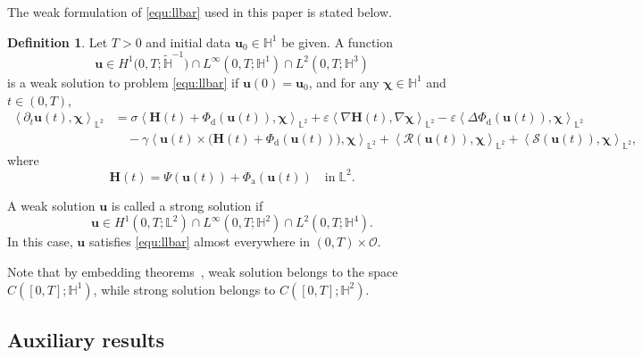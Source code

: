\documentclass[11pt, reqno]{amsart}
\theoremstyle{definition}
\newtheorem{definition}[theorem]{Definition}
\numberwithin{equation}{section}
\newcommand{\bff}{\boldsymbol}
\newcommand{\bb}{\mathbb}
\newcommand{\inpro}[2]{\left\langle#1,#2\right\rangle}
\begin{document}
The weak formulation of \eqref{equ:llbar} used in this paper is stated below.

\begin{definition}\label{def:weakform}
	Let $T>0$ and initial data $\bff{u}_0\in \bb{H}^1$ be given. A function 
    \[
    \bff{u}\in H^1\big(0,T; \widetilde{\bb{H}}^{-1}\big) \cap L^\infty(0,T;\bb{H}^1) \cap L^2(0,T;\bb{H}^3) 
    \]
    is a weak solution to problem
	\eqref{equ:llbar} if $\bff{u}(0)=\bff{u}_0$, and for any $\bff{\chi}\in \bb{H}^1$ and $t\in (0,T)$,
	\begin{align*}
		\inpro{\partial_t \bff{u}(t)}{\bff{\chi}}_{\bb{L}^2}
		&=
		\sigma 
		\inpro{\bff{H}(t)+\Phi_{\mathrm{d}}(\bff{u}(t))}{\bff{\chi}}_{\bb{L}^2}
		+
		\varepsilon
		\inpro{\nabla \bff{H}(t)}{\nabla
			\bff{\chi}}_{\bb{L}^2}
		-
		\varepsilon 
		\inpro{\Delta \Phi_{\mathrm{d}}(\bff{u}(t))}{\bff{\chi}}_{\bb{L}^2}
		\nonumber \\
		&\quad 
		-
		\gamma 
		\inpro{\bff{u}(t) \times \big(\bff{H}(t)+\Phi_{\mathrm{d}}(\bff{u}(t))\big)}{\bff{\chi}}_{\bb{L}^2}
		+
		\inpro{\mathcal{R}(\bff{u}(t))}{\bff{\chi}}_{\bb{L}^2}
        +
		\inpro{\mathcal{S}(\bff{u}(t))}{\bff{\chi}}_{\bb{L}^2},
	\end{align*}
	where 
 \begin{equation}\label{eq:H def}
 \bff{H}(t)= \Psi(\bff{u}(t))+ \Phi_{\mathrm{a}}(\bff{u}(t)) \quad\text{in}\;\bb{L}^2.
 \end{equation}
	
	A weak solution $\bff{u}$ is called a strong solution if
	\[
	\bff{u}\in H^1(0,T;\bb{L}^2) \cap L^\infty(0,T; \bb{H}^2) \cap L^2(0,T;\bb{H}^4).
	\]
	In this case, $\bff{u}$ satisfies \eqref{equ:llbar} almost everywhere in $(0,T)\times \mathscr{O}$.
\end{definition}

Note that by embedding theorems~\cite{LioMag72}, weak solution belongs to the space $C([0,T];\bb{H}^1)$, while strong solution belongs to $C([0,T];\bb{H}^2)$.



\subsection{Auxiliary results}\label{subsec:basic}
\end{document}
